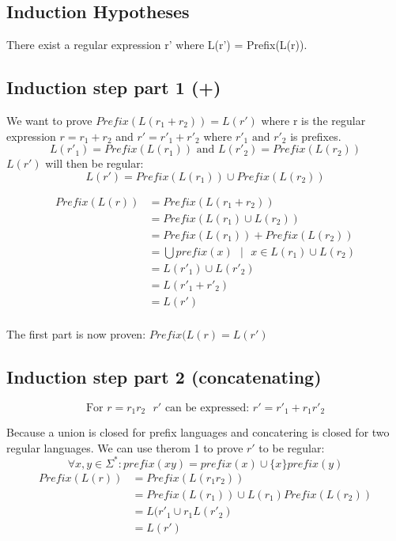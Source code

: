 \documentclass{article}
\begin{document}
\subsection*{Induction Hypotheses}
    There exist a regular expression r' where L(r') = Prefix(L(r)).

\subsection*{Induction step part 1 (+)}
    We want to prove $ Prefix(L(r_1+r_2))=L(r') $ where r is the regular expression $ r = r_1 + r_2 $ and $ r' = r'_1 + r'_2 $ where $ r'_1 \text{ and } r'_2 $ is prefixes.
    $$ L(r'_1)=Prefix(L(r_1)) \text{ and } L(r'_2)=Prefix(L(r_2)) $$
$ L(r') $ will then be regular: 
    $$ L(r')=Prefix(L(r_1)) \cup Prefix(L(r_2)) $$

        \begin{equation*}
            \begin{split}
                Prefix(L(r)) &= Prefix(L(r_1+r_2))\\
                &= Prefix(L(r_1) \cup L(r_2)) \\
                &= Prefix(L(r_1))+Prefix(L(r_2)) \\
                &= \bigcup prefix(x) \text{ } | \text{ } x \in L(r_1) \cup L(r_2) \\
                &= L(r'_1) \cup L(r'_2) \\
                &= L(r'_1+r'_2) \\
                &= L(r') \\
            \end{split}
        \end{equation*}
        
The first part is now proven: $ Prefix(L(r)=L(r') $ 

\subsection*{Induction step part 2 (concatenating)}
        $$ \text{For } r=r_{1}r_2 \text{ } r' \text{ can be expressed: } r'=r'_1+r_{1}r'_2 $$
    
    Because a union is closed for prefix languages and concatering is closed for two regular languages. We can use therom 1 to prove $ r' $ to be regular:
        $$ \forall x,y\in\Sigma^*: prefix(xy) = prefix(x) \cup \{x\}prefix(y)$$
    \begin{equation*}
        \begin{split}
            Prefix(L(r)) &= Prefix(L(r_{1}r_2)) \\
            &= Prefix(L(r_1)) \cup L(r_1)Prefix(L(r_2)) \\
            &= L(r'_1 \cup r_{1}L(r'_2) \\
            &=L(r') \\
        \end{split}
    \end{equation*}
    
\end{document}

